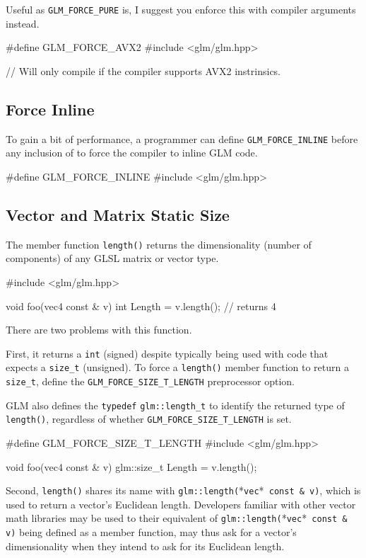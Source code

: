 \documentclass{scrartcl}
\numberwithin{figure}{subsection}
\begin{document}
Useful as \verb|GLM_FORCE_PURE| is, I suggest you enforce this with compiler arguments instead.

\begin{cppcode}
#define GLM_FORCE_AVX2
#include <glm/glm.hpp>

// Will only compile if the compiler supports AVX2 instrinsics.
\end{cppcode}

\subsection{Force Inline}
To gain a bit of performance, a programmer can define \verb|GLM_FORCE_INLINE| before any inclusion of  to force the compiler to inline GLM code.

\begin{cppcode}
#define GLM_FORCE_INLINE 
#include <glm/glm.hpp>
\end{cppcode}

\subsection{Vector and Matrix Static Size}
The member function \verb|length()| returns the dimensionality (number of components) of any GLSL matrix or vector type.

\begin{cppcode}
#include <glm/glm.hpp>

void foo(vec4 const & v)
{
  int Length = v.length();  // returns 4
}
\end{cppcode}

There are two problems with this function.

First, it returns a \verb|int| (signed) despite typically being used with code that expects a \verb|size_t| (unsigned). To force a \verb|length()| member function to return a \verb|size_t|, define the \verb|GLM_FORCE_SIZE_T_LENGTH| preprocessor option.

GLM also defines the \verb|typedef| \verb|glm::length_t| to identify the returned type of \verb|length()|, regardless of whether \verb|GLM_FORCE_SIZE_T_LENGTH| is set.

\begin{cppcode}
#define GLM_FORCE_SIZE_T_LENGTH 
#include <glm/glm.hpp>

void foo(vec4 const & v)
{
  glm::size_t Length = v.length();
}
\end{cppcode}

Second, \verb|length()| shares its name with \verb|glm::length(|*\verb|vec|*\verb| const & v)|, which is used to return a vector's Euclidean length. Developers familiar with other vector math libraries may be used to their equivalent of \verb|glm::length(|*\verb|vec|*\verb| const & v)| being defined as a member function, may thus ask for a vector's dimensionality when they intend to ask for its Euclidean length.
\end{document}
